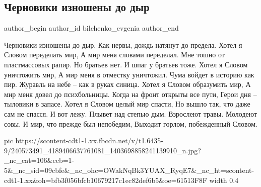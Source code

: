  
 
 
 
 
 
\subsection{Черновики изношены до дыр}
\label{sec:26_08_2021.fb.bilchenko_evgenia.1.chernoviki_iznosheny}
 
\ifcmt
 author_begin
   author_id bilchenko_evgenia
 author_end
\fi

\begin{multicols}{2}
\obeycr
Черновики изношены до дыр.
Как нервы, дождь натянут до предела.
Хотел я Словом переделать мир,
А мир меня словами переделал.
\smallskip
Мне тошно от пластмассовых рапир.
Но братьев нет. И шпаг у братьев тоже.
Хотел я Словом уничтожить мир,
А мир меня в отместку уничтожил.
\smallskip
Чума войдет в историю как пир.
Журавль на небе – как в руках синица.
Хотел я Словом образумить мир,
А мир меня довел до психбольницы.
\smallskip
Когда на фронт открыты все пути,
Герои дня – тыловики в запасе.
Хотел я Словом целый мир спасти,
Но вышло так, что даже сам не спасся.
\smallskip
И вот лежу. Плывет над степью дым.
Взрослеют травы.
Молодеют совы.
И мир, что прежде был непобедим,
Выходит горлом, побежденный Словом.
\restorecr
\end{multicols}

\ifcmt
  pic https://scontent-cdt1-1.xx.fbcdn.net/v/t1.6435-9/240573491_4189406637761081_1403698858241139910_n.jpg?_nc_cat=106&ccb=1-5&_nc_sid=09cbfe&_nc_ohc=OWakNqBk3YUAX_RyqE7&_nc_ht=scontent-cdt1-1.xx&oh=bfb3f056bfcb10679217c1ec82def6b5&oe=61513F8F
  width 0.4
\fi

